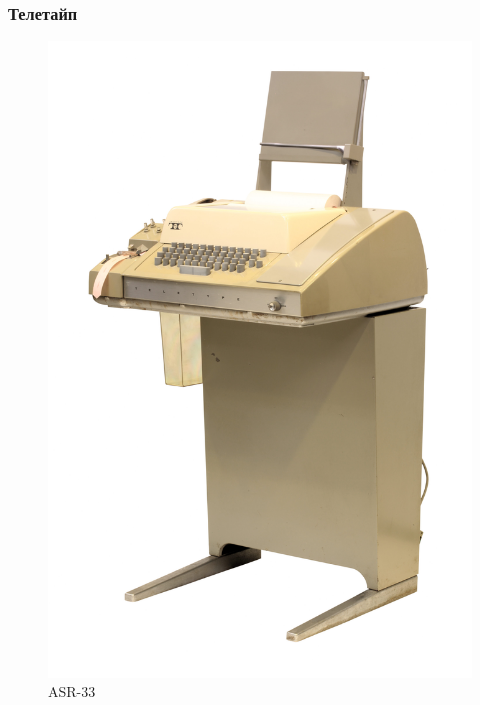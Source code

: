 \documentclass[t,aspectratio=169]{beamer}
\begin{document}
\begin{frame}
    \frametitle{Телетайп}
    \begin{minipage}{0.8\textwidth}
        \begin{figure}
            \begin{centering}
                \includegraphics[height=0.8\textheight]{asr-33}
                \caption{ASR-33}
            \end{centering}
        \end{figure}
    \end{minipage}
    \begin{minipage}{0.19\textwidth}

\end{minipage}
\end{frame}
\end{document}
